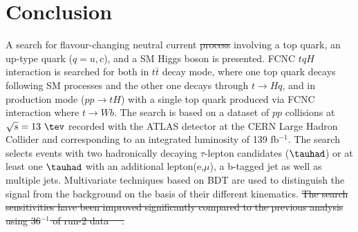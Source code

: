 \documentclass[PAPER, coverpage, atlasdraft=true, texlive=2016, UKenglish]{\ATLASLATEXPATH atlasdoc}
\providecommand{\DIFadd}[1]{{\protect\color{blue}\uwave{#1}}} %
\providecommand{\DIFdel}[1]{{\protect\color{red}\sout{#1}}}                      %
\providecommand{\DIFaddbegin}{} %
\providecommand{\DIFaddend}{} %
\providecommand{\DIFdelbegin}{} %
\providecommand{\DIFdelend}{} %
\begin{document}
\section{Conclusion}
\label{sec:conclusion}
A search for flavour-changing neutral current \DIFdelbegin \DIFdel{process }\DIFdelend \DIFaddbegin \DIFadd{processes }\DIFaddend involving a top quark, an up-type quark ($q=u, c$), and a SM Higgs boson is presented. FCNC $tqH$ interaction is searched for both in $t\bar{t}$ decay mode, where one top quark decays following SM processes and the other one decays through $t\rightarrow Hq$, and in production mode ($pp\rightarrow tH$) with a single top quark produced via FCNC interaction where $t\to Wb$. The search is based on a dataset of $pp$ collisions at $\sqrt{s}=13~\tev$ recorded with the ATLAS detector at the CERN Large Hadron Collider and corresponding to an integrated luminosity of 139 fb$^{-1}$. The search selects events with two hadronically decaying $\tau$-lepton candidates ($\tauhad$) or at least one $\tauhad$ with an additional lepton(e,$\mu$), a b-tagged jet as well as multiple jets. Multivariate techniques based on BDT are used to distinguish the signal from the background on the basis of their different kinematics.
\DIFdelbegin \DIFdel{The search sensitivities have been improved significantly compared to the previous analysis using 36$^{-1}$ of run-2 data~\mbox{%
\cite{Aaboud2019SearchFT}}\hspace{0pt}%
. 
}%
\end{document}
